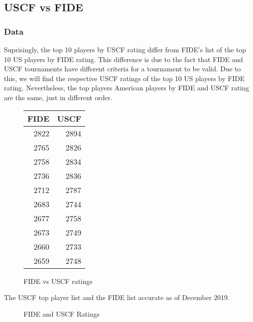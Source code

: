 \documentclass[12pt, titlepage]{article}
\begin{document}
\subsection{USCF vs FIDE}
\subsubsection{Data}
Suprisingly, the top 10 players by USCF rating differ from FIDE's list of the top 10 US players by FIDE rating. This difference is due to the fact that FIDE and USCF tournaments have different criteria for a tournament to be valid. Due to this, we will find the respective USCF ratings of the top 10 US players by FIDE rating. Nevertheless, the top players American players by FIDE and USCF rating are the same, just in different order.

\begin{figure}[H]
\centering
\begin{tabular}{rr}
FIDE & USCF\\
\hline
2822 & 2894\\
2765 & 2826\\
2758 & 2834\\
2736 & 2836\\
2712 & 2787\\
2683 & 2744\\
2677 & 2758\\
2673 & 2749\\
2660 & 2733\\
2659 & 2748\\
\end{tabular}
    \caption{FIDE vs USCF ratings}
  \end{figure}
  
The USCF top player list and the FIDE list accurate as of December 2019.


\begin{figure}[H]
\centering
{}
\caption{FIDE and USCF Ratings}
\end{figure}
\end{document}
